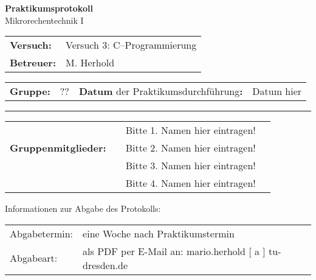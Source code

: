 \documentclass[oneside,a4paper,12pt]{article}
\def\Betreuer{M. Herhold}
\def\Gruppennummer{ ??  }
\def\DatumDerDurchführung{Datum hier}
\def\StudentEins{Bitte 1. Namen hier eintragen!}
\def\StudentZwei{Bitte 2. Namen hier eintragen!}
\def\StudentDrei{Bitte 3. Namen hier eintragen!}
\def\StudentVier{Bitte 4. Namen hier eintragen!}
\begin{document}
\begin{center}
    {\Huge \textbf{Praktikumsprotokoll}\\}
    \bigskip
    {\Large Mikrorechentechnik I}\\
\end{center}

\vfill

\renewcommand{\arraystretch}{1.2}

\begin{tabularx}{\textwidth}{p{2cm} X}
    \textbf{Versuch:} & Versuch 3: C--Programmierung \\[3em]
  \textbf{Betreuer:} & \Betreuer \\ \cline{2-2}
\end{tabularx}

\begin{tabularx}{\textwidth}{p{2cm} p{0.38cm} X p{2.2cm}}
  \textbf{Gruppe:} & \Gruppennummer & \hfill \textbf{Datum} {\small der Praktikumsdurchführung}\textbf{:} & \DatumDerDurchführung \\
  \cline{2-2} \cline{4-4}
\end{tabularx}

\vfill

\renewcommand{\arraystretch}{3}
\rule{\textwidth}{0.5mm}
\begin{tabularx}{\textwidth}{p{4.2cm} | p{0.5cm} X p{0.5cm}}
  & & \StudentEins & \\ \cline{3-3}
  \textbf{Gruppenmitglieder:} & & \StudentZwei & \\  \cline{3-3}
  & & \StudentDrei & \\  \cline{3-3}
  & & \StudentVier & \\  \cline{3-3}
\end{tabularx}

\vfill
\vfill
\renewcommand{\arraystretch}{1}
Informationen zur Abgabe des Protokolls:\\[0.8em]
{\small
    \begin{tabularx}{\textwidth}{p{2.4cm} X}
        Abgabetermin:    & eine Woche nach Praktikumstermin\\[0.6em]
        Abgabeart:       & als PDF per E-Mail an: mario.herhold [ a ] tu-dresden.de\\
    \end{tabularx}}
\end{document}
